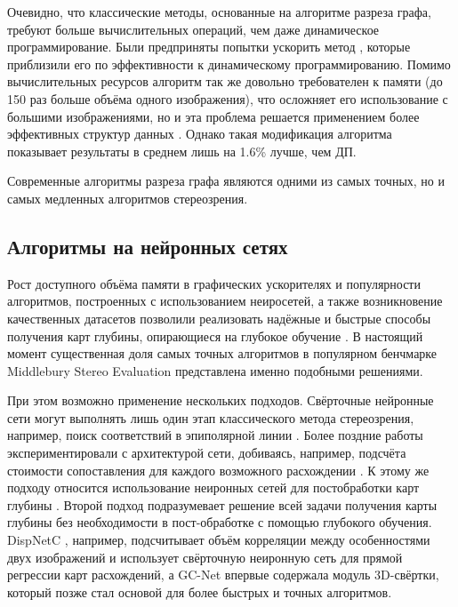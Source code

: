 Очевидно, что классические методы, основанные на алгоритме разреза графа, требуют больше вычислительных операций, чем даже динамическое программирование. Были предприняты попытки ускорить метод \cite{fast_gc,graphcut}, 
которые приблизили его по эффективности к динамическому программированию. Помимо вычислительных ресурсов алгоритм так же довольно требователен к памяти (до  150 раз больше объёма одного изображения), что осложняет его использование 
с большими изображениями, но и эта проблема решается применением более эффективных структур данных \cite{effic_gc}. Однако такая модификация алгоритма показывает результаты в среднем лишь на 1.6\%  лучше, чем ДП. 

Современные алгоритмы разреза графа являются одними из самых точных, но и самых медленных алгоритмов стереозрения.

\subsection{Алгоритмы на нейронных сетях}

Рост доступного объёма памяти в графических ускорителях и популярности алгоритмов, построенных с использованием неиросетей, а также возникновение качественных датасетов позволили реализовать надёжные и быстрые способы 
получения карт глубины, опирающиеся на глубокое обучение \cite{neural_review}. В настоящий момент существенная доля самых точных алгоритмов в популярном бенчмарке Middlebury Stereo Evaluation \cite{stereo_bench} представлена именно
подобными решениями. 

При  этом возможно применение нескольких подходов. Свёрточные нейронные сети могут выполнять лишь один этап классического метода стереозрения, например, поиск соответствий в эпиполярной линии \cite{cnn_match}. Более поздние работы 
экспериментировали с архитектурой сети, добиваясь, например, подсчёта стоимости сопоставления для каждого возможного расхождении \cite{cnn_improv}.  К этому же подходу относится использование неиронных сетей для постобработки 
карт глубины \cite{cnn_post1}.  
Второй подход подразумевает решение всей задачи получения карты глубины без необходимости в пост-обработке с помощью глубокого обучения. DispNetC \cite{cnn_ete1}, например, подсчитывает объём корреляции между особенностями двух изображений и использует свёрточную неиронную сеть 
для прямой регрессии карт расхождений, а GC-Net \cite{gc_net} впервые содержала модуль 3D-свёртки, который позже стал основой для более быстрых и точных алгоритмов.   

